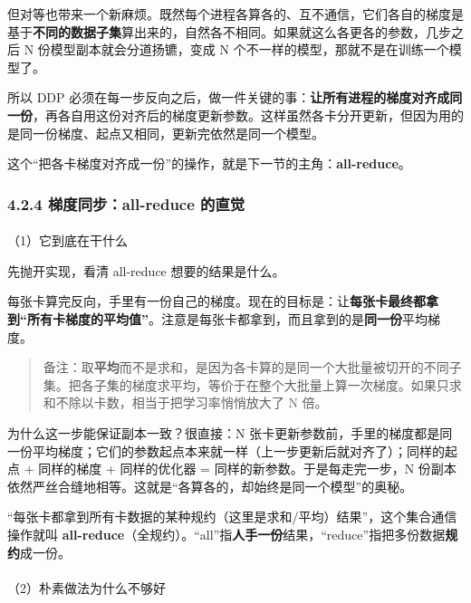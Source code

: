 \documentclass[
  chinese,
]{ctexart}
\makeatletter
\let\oldparagraph\paragraph
\renewcommand{\paragraph}{
    \@ifstar
      \xxxParagraphStar
      \xxxParagraphNoStar
  }
\newcommand{\xxxParagraphStar}[1]{\oldparagraph*{#1}\mbox{}}
\newcommand{\xxxParagraphNoStar}[1]{\oldparagraph{#1}\mbox{}}
\makeatother
\begin{document}
但对等也带来一个新麻烦。既然每个进程各算各的、互不通信，它们各自的梯度是基于\textbf{不同的数据子集}算出来的，自然各不相同。如果就这么各更各的参数，几步之后
N 份模型副本就会分道扬镳，变成 N
个不一样的模型，那就不是在训练一个模型了。

所以 DDP
必须在每一步反向之后，做一件关键的事：\textbf{让所有进程的梯度对齐成同一份}，再各自用这份对齐后的梯度更新参数。这样虽然各卡分开更新，但因为用的是同一份梯度、起点又相同，更新完依然是同一个模型。

这个``把各卡梯度对齐成一份''的操作，就是下一节的主角：\textbf{all-reduce}。

\subsubsection{4.2.4 梯度同步：all-reduce
的直觉}\label{ux68afux5ea6ux540cux6b65all-reduce-ux7684ux76f4ux89c9}

\paragraph{（1）它到底在干什么}\label{ux5b83ux5230ux5e95ux5728ux5e72ux4ec0ux4e48}

先抛开实现，看清 all-reduce 想要的结果是什么。

每张卡算完反向，手里有一份自己的梯度。现在的目标是：让\textbf{每张卡最终都拿到``所有卡梯度的平均值''}。注意是每张卡都拿到，而且拿到的是\textbf{同一份}平均梯度。

\begin{quote}
备注：取\textbf{平均}而不是求和，是因为各卡算的是同一个大批量被切开的不同子集。把各子集的梯度求平均，等价于在整个大批量上算一次梯度。如果只求和不除以卡数，相当于把学习率悄悄放大了
N 倍。
\end{quote}

为什么这一步能保证副本一致？很直接：N
张卡更新参数前，手里的梯度都是同一份平均梯度；它们的参数起点本来就一样（上一步更新后就对齐了）；同样的起点
+ 同样的梯度 + 同样的优化器 = 同样的新参数。于是每走完一步，N
份副本依然严丝合缝地相等。这就是``各算各的，却始终是同一个模型''的奥秘。

``每张卡都拿到所有卡数据的某种规约（这里是求和/平均）结果''，这个集合通信操作就叫
\textbf{all-reduce}（全规约）。``all''指\textbf{人手一份}结果，``reduce''指把多份数据\textbf{规约}成一份。

\paragraph{（2）朴素做法为什么不够好}\label{ux6734ux7d20ux505aux6cd5ux4e3aux4ec0ux4e48ux4e0dux591fux597d}
\end{document}
